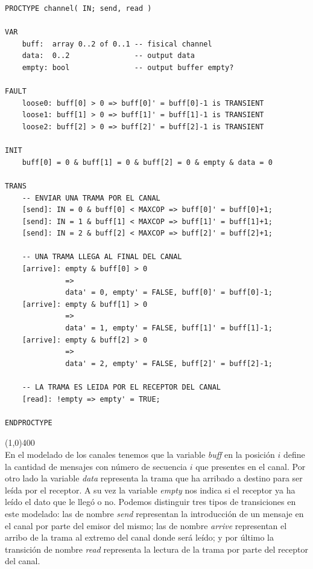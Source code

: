 \documentclass[titlepage, 12pt]{book}
\begin{document}
\begin{verbatim}
PROCTYPE channel( IN; send, read )

VAR
    buff:  array 0..2 of 0..1 -- fisical channel
    data:  0..2               -- output data
    empty: bool               -- output buffer empty?

FAULT
    loose0: buff[0] > 0 => buff[0]' = buff[0]-1 is TRANSIENT
    loose1: buff[1] > 0 => buff[1]' = buff[1]-1 is TRANSIENT
    loose2: buff[2] > 0 => buff[2]' = buff[2]-1 is TRANSIENT
    
INIT
    buff[0] = 0 & buff[1] = 0 & buff[2] = 0 & empty & data = 0

TRANS
    -- ENVIAR UNA TRAMA POR EL CANAL
    [send]: IN = 0 & buff[0] < MAXCOP => buff[0]' = buff[0]+1;
    [send]: IN = 1 & buff[1] < MAXCOP => buff[1]' = buff[1]+1;
    [send]: IN = 2 & buff[2] < MAXCOP => buff[2]' = buff[2]+1;

    -- UNA TRAMA LLEGA AL FINAL DEL CANAL
    [arrive]: empty & buff[0] > 0 
              => 
              data' = 0, empty' = FALSE, buff[0]' = buff[0]-1;
    [arrive]: empty & buff[1] > 0 
              => 
              data' = 1, empty' = FALSE, buff[1]' = buff[1]-1;
    [arrive]: empty & buff[2] > 0 
              => 
              data' = 2, empty' = FALSE, buff[2]' = buff[2]-1;

    -- LA TRAMA ES LEIDA POR EL RECEPTOR DEL CANAL
    [read]: !empty => empty' = TRUE;

ENDPROCTYPE

\end{verbatim}

\noindent \line(1,0){400}\\

En el modelado de los canales tenemos que la variable \textit{buff} en la posición $i$ define la cantidad de mensajes con número de secuencia $i$ que presentes en el canal. Por otro lado la variable \textit{data} representa la trama que ha arribado a destino para ser leída por el receptor. A su vez la variable \textit{empty} nos indica si el receptor ya ha leído el dato que le llegó o no. Podemos distinguir tres tipos de transiciones en este modelado: las de nombre \textit{send} representan la introducción de un mensaje en el canal por parte del emisor del mismo; las de nombre \textit{arrive} representan el arribo de la trama al extremo del canal donde será leído; y por último la transición de nombre \textit{read} representa la lectura de la trama por parte del receptor del canal.\\
\end{document}
